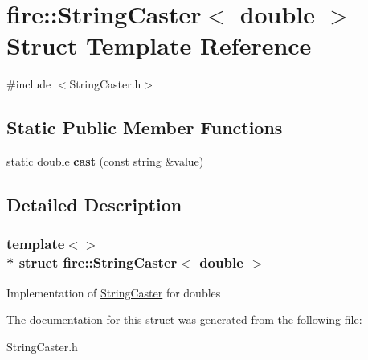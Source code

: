 \hypertarget{a00294}{}\section{fire\+:\+:String\+Caster$<$ double $>$ Struct Template Reference}
\label{a00294}


{\ttfamily \#include $<$String\+Caster.\+h$>$}

\subsection*{Static Public Member Functions}
\begin{DoxyCompactItemize}
\item 
static double {\bfseries cast} (const string \&value)\hypertarget{a00294_a19d0552b656a96820deb3b8db8504340}{}\label{a00294_a19d0552b656a96820deb3b8db8504340}

\end{DoxyCompactItemize}


\subsection{Detailed Description}
\subsubsection*{template$<$$>$\\*
struct fire\+::\+String\+Caster$<$ double $>$}

Implementation of \hyperlink{a00292}{String\+Caster} for doubles 

The documentation for this struct was generated from the following file\+:\begin{DoxyCompactItemize}
\item 
String\+Caster.\+h\end{DoxyCompactItemize}
